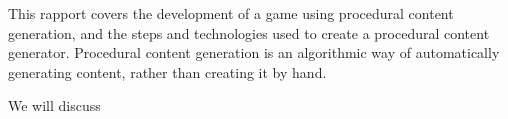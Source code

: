This rapport covers the development of a game using procedural content generation, and the steps and technologies used to create a procedural content generator. Procedural content generation is an algorithmic way of automatically generating content, rather than creating it by hand.

We will discuss 